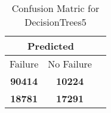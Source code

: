 \begin{table}[] 
\caption{Confusion Matric for DecisionTrees5} 
\label{Table: Prediction Accuracy-DMDDecisionTrees5OnlySunEKF-resetReflectionEKF-top2-Reflection} 
\centering 
\begin{tabular} 
 {@{}ccc@{}} 
\toprule 
\multicolumn{2}{c}{\textbf{Predicted}}
 \\ \midrule 
\multicolumn{1}{|c|}{Failure} & 
\multicolumn{1}{c|}{No Failure}
 \\ \midrule 
\multicolumn{1}{|c|}{\color{green}\textbf{90414}} & 
\multicolumn{1}{c|}{\color{red}\textbf{10224}}
 \\ \midrule 
\multicolumn{1}{|c|}{\color{red}\textbf{18781}} & 
\multicolumn{1}{c|}{\color{green}\textbf{17291}}
 \\ \bottomrule 
\end{tabular} 
\end{table} 
